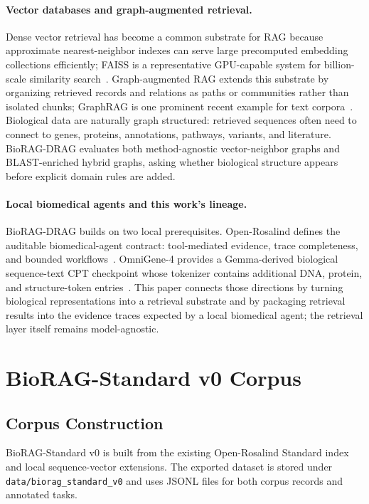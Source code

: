 \documentclass[11pt]{article}
\begin{document}
\paragraph{Vector databases and graph-augmented retrieval.}
Dense vector retrieval has become a common substrate for RAG because approximate nearest-neighbor indexes can serve large precomputed embedding collections efficiently; FAISS is a representative GPU-capable system for billion-scale similarity search~\cite{johnson2017faiss}. Graph-augmented RAG extends this substrate by organizing retrieved records and relations as paths or communities rather than isolated chunks; GraphRAG is one prominent recent example for text corpora~\cite{edge2024graphrag}. Biological data are naturally graph structured: retrieved sequences often need to connect to genes, proteins, annotations, pathways, variants, and literature. BioRAG-DRAG evaluates both method-agnostic vector-neighbor graphs and BLAST-enriched hybrid graphs, asking whether biological structure appears before explicit domain rules are added.

\paragraph{Local biomedical agents and this work's lineage.}
BioRAG-DRAG builds on two local prerequisites. Open-Rosalind defines the auditable biomedical-agent contract: tool-mediated evidence, trace completeness, and bounded workflows~\cite{wang2026openrosalind}. OmniGene-4 provides a Gemma-derived biological sequence-text CPT checkpoint whose tokenizer contains additional DNA, protein, and structure-token entries~\cite{wang2026omnigene4}. This paper connects those directions by turning biological representations into a retrieval substrate and by packaging retrieval results into the evidence traces expected by a local biomedical agent; the retrieval layer itself remains model-agnostic.

\section{BioRAG-Standard v0 Corpus}

\subsection{Corpus Construction}

BioRAG-Standard v0 is built from the existing Open-Rosalind Standard index and local sequence-vector extensions. The exported dataset is stored under \texttt{data/biorag\_standard\_v0} and uses JSONL files for both corpus records and annotated tasks.
\end{document}
